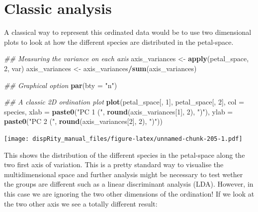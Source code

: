 \documentclass[
]{book}
\newenvironment{Shaded}{\begin{snugshade}}{\end{snugshade}}
\newcommand{\CommentTok}[1]{\textcolor[rgb]{0.56,0.35,0.01}{\textit{#1}}}
\newcommand{\DataTypeTok}[1]{\textcolor[rgb]{0.13,0.29,0.53}{#1}}
\newcommand{\DecValTok}[1]{\textcolor[rgb]{0.00,0.00,0.81}{#1}}
\newcommand{\KeywordTok}[1]{\textcolor[rgb]{0.13,0.29,0.53}{\textbf{#1}}}
\newcommand{\NormalTok}[1]{#1}
\newcommand{\OperatorTok}[1]{\textcolor[rgb]{0.81,0.36,0.00}{\textbf{#1}}}
\newcommand{\StringTok}[1]{\textcolor[rgb]{0.31,0.60,0.02}{#1}}
\begin{document}
\hypertarget{classic-analysis}{%
\section{Classic analysis}\label{classic-analysis}}

A classical way to represent this ordinated data would be to use two dimensional plots to look at how the different species are distributed in the petal-space.

\begin{Shaded}
\begin{Highlighting}[]
\CommentTok{\#\# Measuring the variance on each axis}
\NormalTok{axis\_variances \textless{}{-}}\StringTok{ }\KeywordTok{apply}\NormalTok{(petal\_space, }\DecValTok{2}\NormalTok{, var)}
\NormalTok{axis\_variances \textless{}{-}}\StringTok{ }\NormalTok{axis\_variances}\OperatorTok{/}\KeywordTok{sum}\NormalTok{(axis\_variances)}

\CommentTok{\#\# Graphical option}
\KeywordTok{par}\NormalTok{(}\DataTypeTok{bty =} \StringTok{"n"}\NormalTok{)}

\CommentTok{\#\# A classic 2D ordination plot}
\KeywordTok{plot}\NormalTok{(petal\_space[, }\DecValTok{1}\NormalTok{], petal\_space[, }\DecValTok{2}\NormalTok{], }\DataTypeTok{col =}\NormalTok{ species,}
    \DataTypeTok{xlab =} \KeywordTok{paste0}\NormalTok{(}\StringTok{"PC 1 ("}\NormalTok{, }\KeywordTok{round}\NormalTok{(axis\_variances[}\DecValTok{1}\NormalTok{], }\DecValTok{2}\NormalTok{), }\StringTok{")"}\NormalTok{),}
    \DataTypeTok{ylab =} \KeywordTok{paste0}\NormalTok{(}\StringTok{"PC 2 ("}\NormalTok{, }\KeywordTok{round}\NormalTok{(axis\_variances[}\DecValTok{2}\NormalTok{], }\DecValTok{2}\NormalTok{), }\StringTok{")"}\NormalTok{))}
\end{Highlighting}
\end{Shaded}

\texttt{[image: dispRity\_manual\_files/figure-latex/unnamed-chunk-205-1.pdf]}

This shows the distribution of the different species in the petal-space along the two first axis of variation.
This is a pretty standard way to visualise the multidimensional space and further analysis might be necessary to test wether the groups are different such as a linear discriminant analysis (LDA).
However, in this case we are ignoring the two other dimensions of the ordination!
If we look at the two other axis we see a totally different result:
\end{document}

